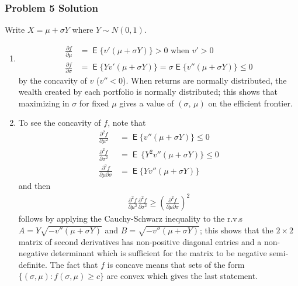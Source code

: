 \documentclass[10pt]{beamer}
\DeclareMathOperator\expc{\mathsf{E}}
\theoremstyle{definition}
\begin{document}
\begin{frame}[allowframebreaks]
  \frametitle{Problem 5 Solution}
  Write $X = \mu + \sigma Y$ where $Y\sim N(0,1)$. 
  \begin{enumerate}
    \item 
      \begin{align*}
        \frac{\partial f}{\partial \mu} &= \expc\{v'(\mu + \sigma Y)\} > 0 \text{ when } v' > 0 \\
        \frac{\partial f}{\partial\sigma} &= \expc\{Yv'(\mu + \sigma Y)\} = \sigma \expc\{v''(\mu + \sigma Y)\} \leqslant 0
      \end{align*}
      by the concavity of $v$ ($v'' < 0$). When returns are normally distributed, the wealth created by each portfolio is normally distributed; this shows that maximizing in $\sigma$ for fixed $\mu$ gives a value of $(\sigma,\,\mu)$ on the efficient frontier.
    \item To see the concavity of $f$, note that
      \begin{align*}
        \frac{\partial^2 f}{\partial \mu^2} &= \expc\{v''(\mu + \sigma Y)\} \leqslant 0 \\
        \frac{\partial^2 f}{\partial \sigma^2} &= \expc\,\{Y^2v''(\mu + \sigma Y)\} \leqslant 0 \\
        \frac{\partial^2 f}{\partial \mu \partial \sigma} &= \expc\{Yv''(\mu + \sigma Y)\}
      \end{align*}
      and then
      \begin{align*}
        \frac{\partial^2 f}{\partial \mu^2}\frac{\partial^2 f}{\partial \sigma^2} \geqslant \left(\frac{\partial^2 f}{\partial \mu \partial \sigma}\right)^2
      \end{align*}
      follows by applying the Cauchy-Schwarz inequality to the r.v.s $A = Y\sqrt{-v''(\mu + \sigma Y)}$ and $B = \sqrt{-v''(\mu + \sigma Y)}$; this shows that the $2 \times 2$ matrix of second derivatives has non-positive diagonal entries and a non-negative determinant which is sufficient for the matrix to be negative semi-definite. The fact that $f$ is concave means that sets of the form $\{(\sigma,\mu) : f(\sigma,\mu) \geqslant c\}$ are convex which gives the last statement.
  \end{enumerate}
\end{frame}
\end{document}
